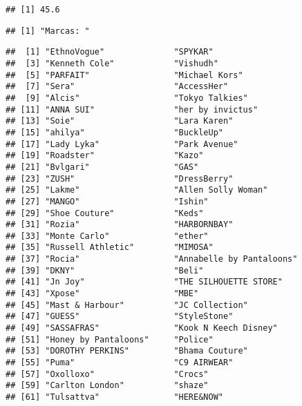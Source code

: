 \documentclass[
]{article}
\newenvironment{Shaded}{\begin{snugshade}}{\end{snugshade}}
\newcommand{\FunctionTok}[1]{\textcolor[rgb]{0.00,0.00,0.00}{#1}}
\newcommand{\NormalTok}[1]{#1}
\newcommand{\OtherTok}[1]{\textcolor[rgb]{0.56,0.35,0.01}{#1}}
\newcommand{\SpecialCharTok}[1]{\textcolor[rgb]{0.00,0.00,0.00}{#1}}
\newcommand{\StringTok}[1]{\textcolor[rgb]{0.31,0.60,0.02}{#1}}
\begin{document}
\begin{verbatim}
## [1] 45.6
\end{verbatim}

\begin{Shaded}
\end{Shaded}

\begin{verbatim}
## [1] "Marcas: "
\end{verbatim}

\begin{Shaded}
\end{Shaded}

\begin{verbatim}
##  [1] "EthnoVogue"              "SPYKAR"                 
##  [3] "Kenneth Cole"            "Vishudh"                
##  [5] "PARFAIT"                 "Michael Kors"           
##  [7] "Sera"                    "AccessHer"              
##  [9] "Alcis"                   "Tokyo Talkies"          
## [11] "ANNA SUI"                "her by invictus"        
## [13] "Soie"                    "Lara Karen"             
## [15] "ahilya"                  "BuckleUp"               
## [17] "Lady Lyka"               "Park Avenue"            
## [19] "Roadster"                "Kazo"                   
## [21] "Bvlgari"                 "GAS"                    
## [23] "ZUSH"                    "DressBerry"             
## [25] "Lakme"                   "Allen Solly Woman"      
## [27] "MANGO"                   "Ishin"                  
## [29] "Shoe Couture"            "Keds"                   
## [31] "Rozia"                   "HARBORNBAY"             
## [33] "Monte Carlo"             "ether"                  
## [35] "Russell Athletic"        "MIMOSA"                 
## [37] "Rocia"                   "Annabelle by Pantaloons"
## [39] "DKNY"                    "Beli"                   
## [41] "Jn Joy"                  "THE SILHOUETTE STORE"   
## [43] "Xpose"                   "MBE"                    
## [45] "Mast & Harbour"          "JC Collection"          
## [47] "GUESS"                   "StyleStone"             
## [49] "SASSAFRAS"               "Kook N Keech Disney"    
## [51] "Honey by Pantaloons"     "Police"                 
## [53] "DOROTHY PERKINS"         "Bhama Couture"          
## [55] "Puma"                    "C9 AIRWEAR"             
## [57] "Oxolloxo"                "Crocs"                  
## [59] "Carlton London"          "shaze"                  
## [61] "Tulsattva"               "HERE&NOW"
\end{verbatim}
\end{document}
